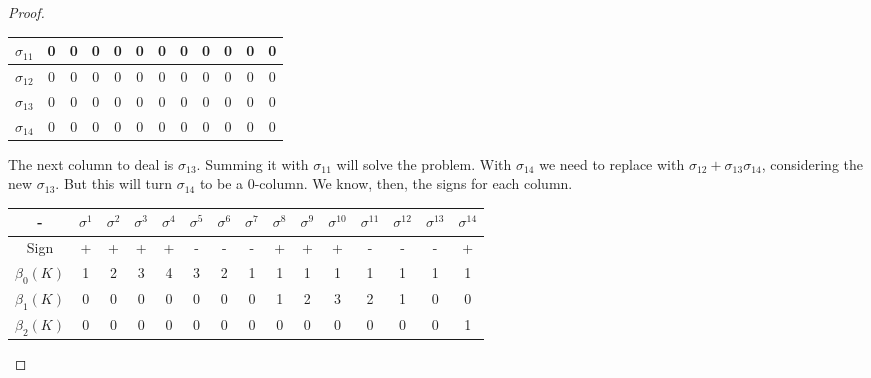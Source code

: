 \begin{proof}
\begin{enumerate}
\begin{center}
\begin{tabular}{|c|c|c|c|c|c|c|c|c|c|c|c|}
            $\sigma_{11}$ & 0                  & 0          & 0          & 0          & 0          & 0          & 0             & 0             & 0             & 0             & 0             \\ \hline
            $\sigma_{12}$ & 0                  & 0          & 0          & 0          & 0          & 0          & 0             & 0             & 0             & 0             & 0             \\ \hline
            $\sigma_{13}$ & 0                  & 0          & 0          & 0          & 0          & 0          & 0             & 0             & 0             & 0             & 0             \\ \hline
            $\sigma_{14}$ & 0                  & 0          & 0          & 0          & 0          & 0          & 0             & 0             & 0             & 0             & 0             \\ \hline
        \end{tabular}
    \end{center}

    The next column to deal is $\sigma_{13}$. Summing it with $\sigma_{11}$
    will solve the problem. With $\sigma_{14}$ we need to replace with
    $\sigma_{12} + \sigma_{13} \sigma_{14}$, considering the new
    $\sigma_{13}$. But this will turn $\sigma_{14}$ to be a 0-column. We know,
    then, the signs for each column. 

    \begin{center}
        \begin{tabular}{ c|c|c|c|c|c|c|c|c|c|c|c|c|c|c}
         - & $\sigma^1$ & $\sigma^2$ & $\sigma^3$ & $\sigma^4$ & $\sigma^5$ &
         $\sigma^6$ & $\sigma^7$ &$\sigma^8$ &$\sigma^9$ &$\sigma^{10}$
         &$\sigma^{11}$ &$\sigma^{12}$ &$\sigma^{13}$ &$\sigma^{14}$ \\ 
         \hline
         Sign & + & + & + & + & - & - & - & + & + & + & - & - & - & + \\  
         $\beta_0(K)$ & 1 & 2 & 3 & 4 & 3 & 2 & 1 & 1 & 1 & 1 & 1 & 1 & 1 & 1\\ 
         $\beta_1(K)$ & 0 & 0 & 0 & 0 & 0 & 0 & 0 & 1 & 2 & 3 & 2 & 1 & 0 & 0 \\     
         $\beta_2(K)$ & 0 & 0 & 0 & 0 & 0 & 0 & 0 & 0 & 0 & 0 & 0 & 0 & 0 & 1\\     

        \end{tabular}
    \end{center}

\end{enumerate}

\end{proof}